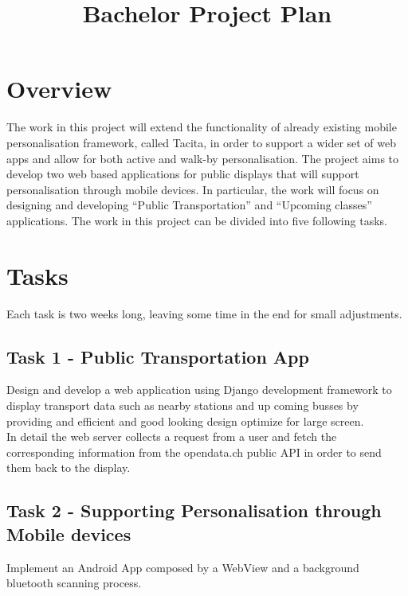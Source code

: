 \documentclass[11pt]{report}
\begin{document}
\title{Bachelor Project Plan}
\maketitle
%
\section*{Overview}
The work in this project will extend the functionality of already existing mobile personalisation framework, called Tacita, in order to support a wider set of web apps and allow for both active and walk-by personalisation. The project aims to develop two web based applications for public displays that will support personalisation through mobile devices. In particular, the work will focus on designing and developing “Public Transportation” and “Upcoming classes” applications. The work in this project can be divided into five following tasks.
\section*{Tasks}
Each task is two weeks long, leaving some time in the end for small adjustments. 
\subsection*{Task 1 - Public Transportation App}
Design and develop a web application using Django development framework to display transport data such as nearby stations and up coming busses by providing and efficient and good looking design optimize for large screen.\\

In detail the web server collects a request from a user and fetch the corresponding information from the opendata.ch public API in order to send them back to the display. 

\subsection*{Task 2 - Supporting Personalisation through Mobile devices}
Implement an Android App composed by a WebView and a background bluetooth scanning process. 
\\
\end{document}
